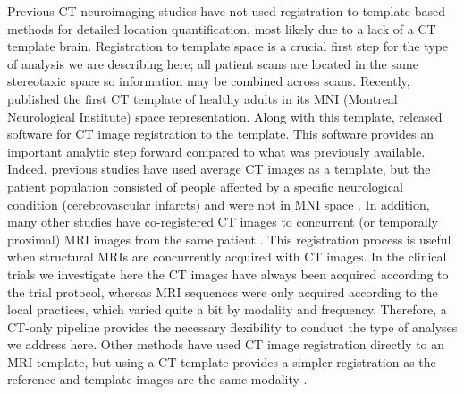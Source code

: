 \documentclass[10pt]{article}\usepackage[]{graphicx}\usepackage[]{color}
\begin{document}


Previous CT neuroimaging studies have not used registration-to-template-based methods for detailed location quantification, most likely due to a lack of a CT template brain.  Registration to template space is a crucial first step for the type of analysis we are describing here; all patient scans are located in the same stereotaxic space so information may be combined across scans.
Recently, \citet{rorden_age-specific_2012} published the first CT template of healthy adults in its MNI (Montreal Neurological Institute) space representation.  Along with this template, \citet{rorden_age-specific_2012} released software for CT image registration to the template.  This software provides an important analytic step forward compared to what was previously available. Indeed, previous studies have used average CT images as a template, but the patient population consisted of people affected by a specific neurological condition (cerebrovascular infarcts) and were not in MNI space \citep{jongen_construction_2004}.  In addition, many other studies have co-registered CT images to concurrent (or temporally proximal) MRI images from the same patient \citep{fitzpatrick_visual_1998, das_affine-based_2011, bhattacharya_registration_2000, pelizzari_accurate_1989}.  This registration process is useful when structural MRIs are concurrently acquired with CT images.  In the clinical trials we investigate here the CT images have always been acquired according to the trial protocol, whereas MRI sequences were only acquired according to the local practices, which varied quite a bit by modality and frequency.  Therefore, a CT-only pipeline provides the necessary flexibility to conduct the type of analyses we address here. 
Other methods have used CT image registration directly to an MRI template, but using a CT template provides a simpler registration as the reference and template images are the same modality \citep{solomon_user-friendly_2007, li_registration_2010, princich_rapid_2013}.
\end{document}
